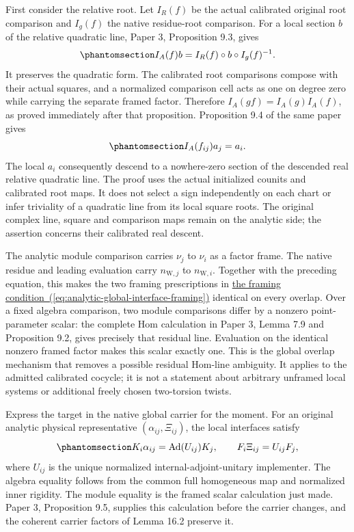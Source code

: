 \documentclass[
  english,
  11pt,
  reqno]{amsart}
\begin{document}
First consider the relative root. Let \(I_R(f)\) be the actual
calibrated original root comparison and \(I_g(f)\) the native
residue-root comparison. For a local section \(b\) of the relative
quadratic line, Paper 3, Proposition 9.3, gives
\begin{equation}\protect\phantomsection\label{eq:analytic-bridge-quadratic-line-map}{
I_A(f)b=I_R(f)\circ b\circ I_g(f)^{-1}.
}\end{equation} It preserves the quadratic form. The calibrated root
comparisons compose with their actual squares, and a normalized
comparison cell acts as one on degree zero while carrying the separate
framed factor. Therefore \(I_A(gf)=I_A(g)I_A(f)\), as proved immediately
after that proposition. Proposition 9.4 of the same paper gives
\begin{equation}\protect\phantomsection\label{eq:analytic-bridge-initialized-root-cocycle}{
I_A(f_{ij})a_j=a_i.
}\end{equation} The local \(a_i\) consequently descend to a nowhere-zero
section of the descended real relative quadratic line. The proof uses
the actual initialized counits and calibrated root maps. It does not
select a sign independently on each chart or infer triviality of a
quadratic line from its local square roots. The original complex line,
square and comparison maps remain on the analytic side; the assertion
concerns their calibrated real descent.

The analytic module comparison carries \(\nu_j\) to \(\nu_i\) as a
factor frame. The native residue and leading evaluation carry
\(n_{\mathrm W,j}\) to \(n_{\mathrm W,i}\). Together with the preceding
equation, this makes the two framing prescriptions in
\hyperref[eq:analytic-global-interface-framing]{the framing condition~(\ref*{eq:analytic-global-interface-framing})}
identical on every overlap. Over a fixed algebra comparison, two module
comparisons differ by a nonzero point-parameter scalar: the complete Hom
calculation in Paper 3, Lemma 7.9 and Proposition 9.2, gives precisely
that residual line. Evaluation on the identical nonzero framed factor
makes this scalar exactly one. This is the global overlap mechanism that
removes a possible residual Hom-line ambiguity. It applies to the
admitted calibrated cocycle; it is not a statement about arbitrary
unframed local systems or additional freely chosen two-torsion twists.

Express the target in the native global carrier for the moment. For an
original analytic physical representative \((\alpha_{ij},\Xi_{ij})\),
the local interfaces satisfy
\begin{equation}\protect\phantomsection\label{eq:analytic-global-physical-overlap}{
K_i\alpha_{ij}=\operatorname{Ad}(U_{ij})K_j,
\qquad
F_i\Xi_{ij}=U_{ij}F_j,
}\end{equation} where \(U_{ij}\) is the unique normalized
internal-adjoint-unitary implementer. The algebra equality follows from
the common full homogeneous map and normalized inner rigidity. The
module equality is the framed scalar calculation just made. Paper 3,
Proposition 9.5, supplies this calculation before the carrier changes,
and the coherent carrier factors of Lemma 16.2 preserve it.
\end{document}
